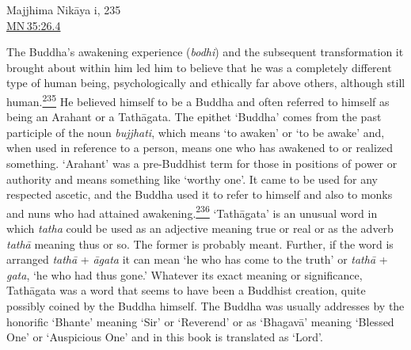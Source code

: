 Majjhima Nikāya i, 235\\
\href{https://suttacentral.net/mn35/en/sujato\#26.4}{MN\,35:26.4}

The Buddha's awakening experience (\emph{bodhi}) and the subsequent
transformation it brought about within him led him to believe that he
was a completely different type of human being, psychologically and
ethically far above others, although still
human.\label{footprints_split_010.html_fnref235}\hyperref[footprints_split_024.htmlux5cux23fn235]{\textsuperscript{235}}
He believed himself to be a Buddha and often referred to himself as
being an Arahant or a Tathāgata. The epithet `Buddha' comes from the
past participle of the noun \emph{bujjhati}, which means `to awaken' or
`to be awake' and, when used in reference to a person, means one who has
awakened to or realized something. `Arahant' was a pre-Buddhist term for
those in positions of power or authority and means something like
`worthy one'. It came to be used for any respected ascetic, and the
Buddha used it to refer to himself and also to monks and nuns who had
attained
awakening.\label{footprints_split_010.html_fnref236}\hyperref[footprints_split_024.htmlux5cux23fn236]{\textsuperscript{236}}
`Tathāgata' is an unusual word in which \emph{tatha} could be used as an
adjective meaning true or real or as the adverb \emph{tathā} meaning
thus or so. The former is probably meant. Further, if the word is
arranged \emph{tathā} + \emph{āgata} it can mean `he who has come to the
truth' or \emph{tathā} + \emph{gata}, `he who had thus gone.' Whatever
its exact meaning or significance, Tathāgata was a word that seems to
have been a Buddhist creation, quite possibly coined by the Buddha
himself. The Buddha was usually addresses by the honorific `Bhante'
meaning `Sir' or `Reverend' or as `Bhagavā' meaning `Blessed One' or
`Auspicious One' and in this book is translated as `Lord'.

